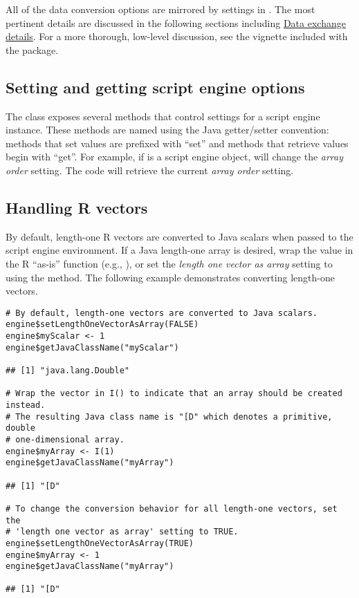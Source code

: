 All of the  data conversion options are mirrored by settings in . The most pertinent details are discussed in the following sections including \hyperlink{dataexchangedetails}{Data exchange details}. For a more thorough, low-level discussion, see the vignette included with the  package. 

\subsection{Setting and getting script engine options}

The   class exposes several methods that control settings for a script engine instance. These methods are named using the Java getter/setter convention: methods that set values are prefixed with ``set'' and methods that retrieve values begin with ``get''. For example, if  is a script engine object,  will change the \textit{array order} setting. The code  will retrieve the current \textit{array order} setting.

\hypertarget{handlingrvectors}{\subsection{Handling R vectors}}

By default, length-one R vectors are converted to Java scalars when passed to the script engine environment. If a Java length-one array is desired, wrap the value in the R ``as-is'' function (e.g., ), or set the \textit{length one vector as array} setting to  using the  method. The following example demonstrates converting length-one vectors.

\begin{verbatim}
# By default, length-one vectors are converted to Java scalars.
engine$setLengthOneVectorAsArray(FALSE)
engine$myScalar <- 1
engine$getJavaClassName("myScalar")

## [1] "java.lang.Double"

# Wrap the vector in I() to indicate that an array should be created instead.
# The resulting Java class name is "[D" which denotes a primitive, double 
# one-dimensional array.
engine$myArray <- I(1)
engine$getJavaClassName("myArray")

## [1] "[D"

# To change the conversion behavior for all length-one vectors, set the 
# 'length one vector as array' setting to TRUE.
engine$setLengthOneVectorAsArray(TRUE)
engine$myArray <- 1
engine$getJavaClassName("myArray")

## [1] "[D"
\end{verbatim}

